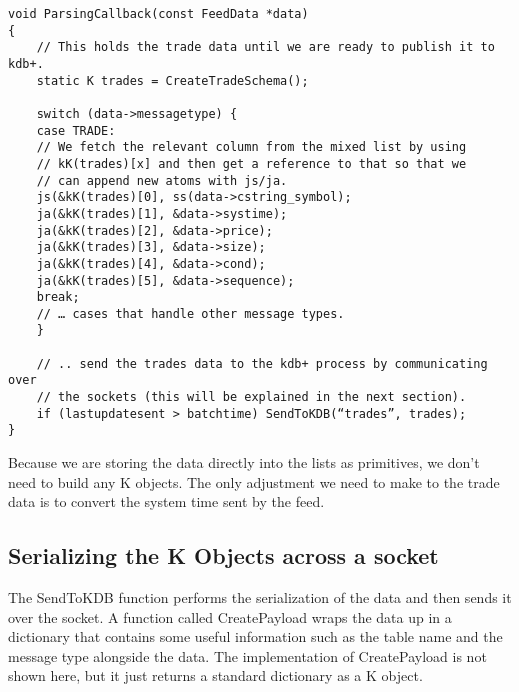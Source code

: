 \begin{lstlisting}
void ParsingCallback(const FeedData *data)
{
	// This holds the trade data until we are ready to publish it to kdb+.
	static K trades = CreateTradeSchema();

	switch (data->messagetype) {
	case TRADE:
	// We fetch the relevant column from the mixed list by using
	// kK(trades)[x] and then get a reference to that so that we
	// can append new atoms with js/ja.
	js(&kK(trades)[0], ss(data->cstring_symbol);
	ja(&kK(trades)[1], &data->systime);
	ja(&kK(trades)[2], &data->price);
	ja(&kK(trades)[3], &data->size);
	ja(&kK(trades)[4], &data->cond);
	ja(&kK(trades)[5], &data->sequence);
	break;
	// … cases that handle other message types.
	}

	// .. send the trades data to the kdb+ process by communicating over
	// the sockets (this will be explained in the next section).
	if (lastupdatesent > batchtime) SendToKDB(“trades”, trades);
}
\end{lstlisting}

Because we are storing the data directly into the lists as primitives, we don't need to build any K objects.
The only adjustment we need to make to the trade data is to convert the system time sent by the feed.

\subsection{Serializing the K Objects across a socket}

The SendToKDB function performs the serialization of the data and then sends it over the socket. A function called
CreatePayload wraps the data up in a dictionary that contains some useful information such as the table name and the
message type alongside the data. The implementation of CreatePayload is not shown here, but it just returns a standard
dictionary as a K object.

